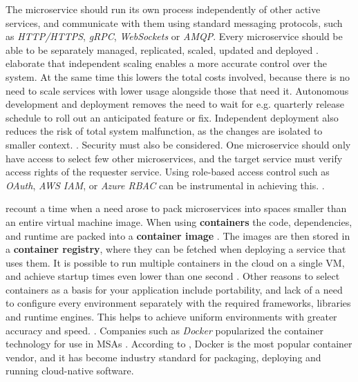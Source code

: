 \documentclass[utf8,english]{gradu3}
\begin{document}
The microservice should run its own process independently of other active
services, and communicate with them using standard messaging protocols, such as
\textit{HTTP/HTTPS}, \textit{gRPC}, \textit{WebSockets} or \textit{AMQP}. Every
microservice should be able to be separately managed, replicated, scaled,
updated and deployed \parencite[18]{Gannon2017}. \textcite{Microsoft2022-CNA}
elaborate that independent scaling enables a more accurate control over the
system. At the same time this lowers the total costs involved, because there is
no need to scale services with lower usage alongside those that need it.
Autonomous development and deployment removes the need to wait for e.g.
quarterly release schedule to roll out an anticipated feature or fix.
Independent deployment also reduces the risk of total system malfunction, as the
changes are isolated to smaller context. \parencite{Microsoft2022-CNA}. Security
must also be considered. One microservice should only have access to select few
other microservices, and the target service must verify access rights of the
requester service. Using role-based access control such as \textit{OAuth},
\textit{AWS IAM}, or \textit{Azure RBAC} can be instrumental in achieving this.
\parencite[18]{Gannon2017}.

\textcite[18]{Gannon2017} recount a time when a need arose to pack microservices
into spaces smaller than an entire virtual machine image. When using
\textbf{containers} the code, dependencies, and runtime are packed into a
\textbf{container image} \parencite{Microsoft2022-CNA}. The images are then stored
in a \textbf{container registry}, where they can be fetched when deploying a
service that uses them. It is possible to run multiple containers in the cloud
on a single VM, and achieve startup times even lower than one second
\parencite[18]{Gannon2017}. Other reasons to select containers as a basis for
your application include portability, and lack of a need to configure every
environment separately with the required frameworks, libraries and runtime
engines. This helps to achieve uniform environments with greater accuracy and
speed. \parencite{Microsoft2022-CNA}. Companies such as \textit{Docker} popularized
the container technology for use in MSAs \parencite[18]{Gannon2017}. According
to \textcite{Microsoft2022-CNA}, Docker is the most popular container vendor, and it
has become industry standard for packaging, deploying and running cloud-native
software.
\end{document}
